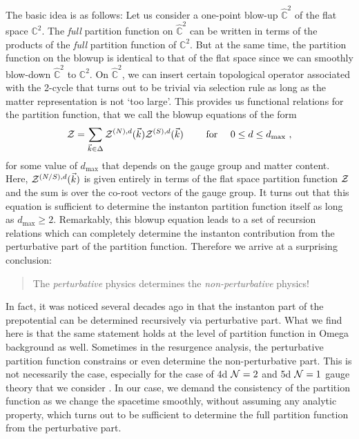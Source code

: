 \documentclass[letterpaper, 11pt]{article}
\def\IC{\mathbb{C}}
\def\CN{{\cal N}}
\def\CZ{{\cal Z}}
\begin{document}
The basic idea is as follows: Let us consider a one-point blow-up $\hat{\IC}^2$ of the flat space $\IC^2$. The \emph{full} partition function on $\hat{\IC}^2$ can be written in terms of the products of the \emph{full} partition function of $\IC^2$. But at the same time, the partition function on the blowup is identical to that of the flat space since we can smoothly blow-down $\hat{\IC}^2$ to $\IC^2$. On $\hat{\IC}^2$, we can insert certain topological operator associated with the 2-cycle that turns out to be trivial via selection rule as long as the matter representation is not `too large'. This provides us functional relations for the partition function, that we call the blowup equations of the form
\begin{align}
 \CZ = \sum_{\vec{k} \in \Delta} \CZ^{(N), d}(\vec{k}) \CZ^{(S), d}(\vec{k}) \qquad \textrm{ for }\quad 0 \le d \le d_{\text{max}} \ , 
\end{align}
for some value of $d_\text{max}$ that depends on the gauge group and matter content. Here, $\CZ^{(N/S), d} (\vec{k})$ is given entirely in terms of the flat space partition function $\CZ$ and the sum is over the co-root vectors of the gauge group. 
It turns out that this equation is sufficient to determine the instanton partition function itself as long as $d_\text{max} \ge 2$. Remarkably, this blowup equation leads to a set of recursion relations which can completely determine the instanton contribution from the perturbative part of the partition function. Therefore we arrive at a surprising conclusion: 
\begin{quote}
\centering
The \emph{perturbative} physics determines the \emph{non-perturbative} physics! 	
\end{quote}
In fact, it was noticed several decades ago in \cite{Edelstein:1998sp, Edelstein:1999xk} that the instanton part of the  prepotential can be determined recursively via perturbative part. What we find here is that the same statement holds at the level of partition function in Omega background as well. 
Sometimes in the resurgence analysis, the perturbative partition function constrains or even determine the non-perturbative part. This is not necessarily the case, especially for the case of 4d $\CN=2$ and 5d $\CN=1$ gauge theory that we consider \cite{Honda:2016mvg}. In our case, we demand the consistency of the partition function as we change the spacetime smoothly, without assuming any analytic property, which turns out to be sufficient to determine the full partition function from the perturbative part. 
\end{document}
